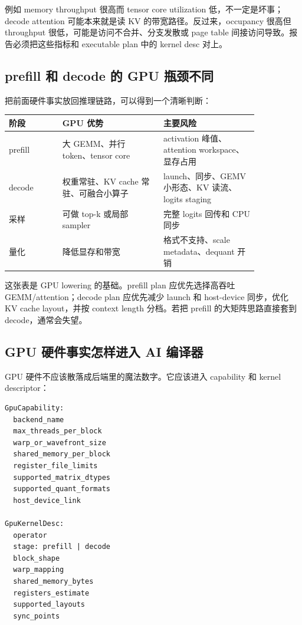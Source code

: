 例如 memory throughput 很高而 tensor core utilization 低，不一定是坏事；decode attention 可能本来就是读 KV 的带宽路径。反过来，occupancy 很高但 throughput 很低，可能是访问不合并、分支发散或 page table 间接访问导致。报告必须把这些指标和 executable plan 中的 kernel desc 对上。

\subsection{prefill 和 decode 的 GPU 瓶颈不同}

把前面硬件事实放回推理链路，可以得到一个清晰判断：

\begin{center}
\begin{tabular}{p{0.18\linewidth}p{0.34\linewidth}p{0.32\linewidth}}
\toprule
阶段 & GPU 优势 & 主要风险 \\
\midrule
prefill & 大 GEMM、并行 token、tensor core & activation 峰值、attention workspace、显存占用 \\
decode & 权重常驻、KV cache 常驻、可融合小算子 & launch、同步、GEMV 小形态、KV 读流、logits staging \\
采样 & 可做 top-k 或局部 sampler & 完整 logits 回传和 CPU 同步 \\
量化 & 降低显存和带宽 & 格式不支持、scale metadata、dequant 开销 \\
\bottomrule
\end{tabular}
\end{center}

这张表是 GPU lowering 的基础。prefill plan 应优先选择高吞吐 GEMM/attention；decode plan 应优先减少 launch 和 host-device 同步，优化 KV cache layout，并按 context length 分档。若把 prefill 的大矩阵思路直接套到 decode，通常会失望。

\subsection{GPU 硬件事实怎样进入 AI 编译器}

GPU 硬件不应该散落成后端里的魔法数字。它应该进入 capability 和 kernel descriptor：

\begin{lstlisting}[numbers=none,caption={GPU capability 和 kernel descriptor 字段}]
GpuCapability:
  backend_name
  max_threads_per_block
  warp_or_wavefront_size
  shared_memory_per_block
  register_file_limits
  supported_matrix_dtypes
  supported_quant_formats
  host_device_link

GpuKernelDesc:
  operator
  stage: prefill | decode
  block_shape
  warp_mapping
  shared_memory_bytes
  registers_estimate
  supported_layouts
  sync_points
\end{lstlisting}

